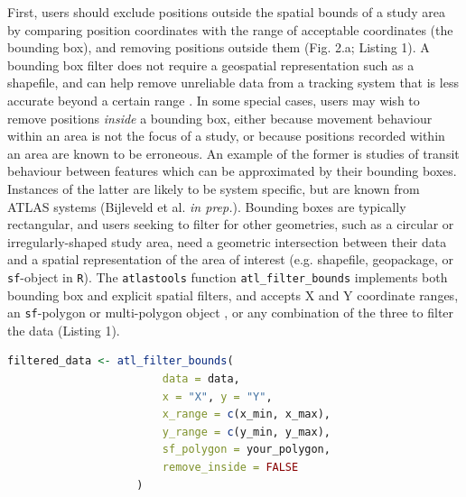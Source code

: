 \documentclass[10pt,paper=a4,headings=standardclasses
]{scrartcl}
\begin{document}
First, users should exclude positions outside the spatial bounds of a study area by comparing position coordinates with the range of acceptable coordinates (the bounding box), and removing positions outside them (Fig. 2.a; Listing 1). 
A bounding box filter does not require a geospatial representation such as a shapefile, and can help remove unreliable data from a tracking system that is less accurate beyond a certain range \citep[e.g. in ATLAS systems][]{beardsworth2021}.
In some special cases, users may wish to remove positions \textit{inside} a bounding box, either because movement behaviour within an area is not the focus of a study, or because positions recorded within an area are known to be erroneous.
An example of the former is studies of transit behaviour between features which can be approximated by their bounding boxes. 
Instances of the latter are likely to be system specific, but are known from ATLAS systems (Bijleveld et al. \textit{in prep.}). 
Bounding boxes are typically rectangular, and users seeking to filter for other geometries, such as a circular or irregularly-shaped study area, need a geometric intersection between their data and a spatial representation of the area of interest (e.g. shapefile, geopackage, or \texttt{sf}-object in \texttt{R}).
The \texttt{atlastools} function \texttt{atl\_filter\_bounds} implements both bounding box and explicit spatial filters, and accepts X and Y coordinate ranges, an \texttt{sf}-polygon or multi-polygon object \citep{pebesma2018}, or any combination of the three to filter the data (Listing 1).

\begin{lstlisting}[float,floatplacement=h!,language=R, style=customR, caption = {
    The \texttt{atl\_filter\_bounds} function filters on an area defined by coordinate ranges, a polygon, or all three; it can remove positions outside (\texttt{remove\_inside = FALSE}), or within the area (\texttt{remove\_inside = TRUE}).
    The arguments \texttt{x} and \texttt{y} determine the X and Y coordinate columns, \texttt{x\_range} and \texttt{y\_range} are the filter bounds in a coordinate reference system in metres, and the data can be filtered by an \texttt{sf-(MULTI)POLYGON} can be passed using the \texttt{sf\_polygon} argument. 
    The output is a \texttt{data.table}, which must be saved as an object (here, \texttt{filtered\_data}).}]
filtered_data <- atl_filter_bounds(
                        data = data,
                        x = "X", y = "Y",
                        x_range = c(x_min, x_max),
                        y_range = c(y_min, y_max),
                        sf_polygon = your_polygon,
                        remove_inside = FALSE
                    )
\end{lstlisting}
\end{document}

